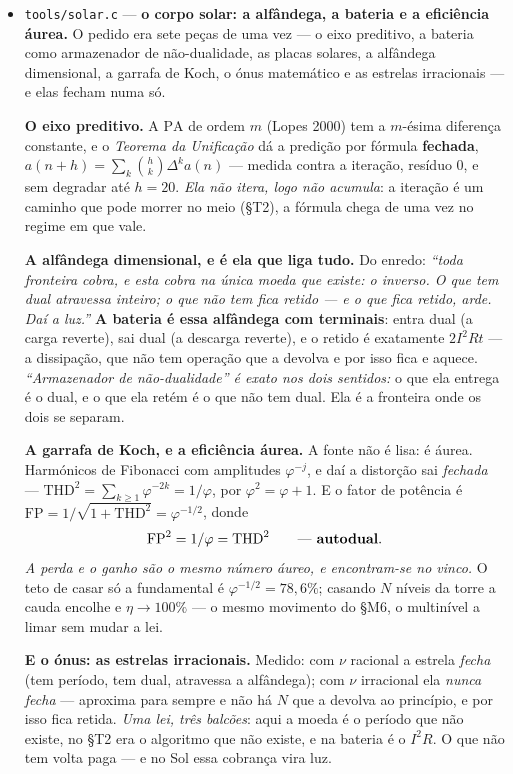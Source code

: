 \documentclass[11pt]{article}
\newcommand{\code}[1]{\texttt{\small #1}}
\theoremstyle{plain}
\theoremstyle{remark}
\begin{document}
\begin{itemize}
\item \code{tools/solar.c} --- \textbf{o corpo solar: a alfândega, a bateria e a eficiência
áurea.} O pedido era sete peças de uma vez --- o eixo preditivo, a bateria como armazenador de
não-dualidade, as placas solares, a alfândega dimensional, a garrafa de Koch, o ónus matemático e
as estrelas irracionais --- e elas fecham numa só.

\textbf{O eixo preditivo.} A $\mathrm{PA}$ de ordem $m$ (Lopes 2000) tem a $m$-ésima diferença
constante, e o \emph{Teorema da Unificação} dá a predição por fórmula \textbf{fechada},
$a(n{+}h)=\sum_k \binom{h}{k}\Delta^k a(n)$ --- medida contra a iteração, resíduo $0$, e sem
degradar até $h=20$. \emph{Ela não itera, logo não acumula}: a iteração é um caminho que pode
morrer no meio (§T2), a fórmula chega de uma vez no regime em que vale.

\textbf{A alfândega dimensional, e é ela que liga tudo.} Do enredo: \emph{``toda fronteira cobra, e
esta cobra na única moeda que existe: o inverso. O que tem dual atravessa inteiro; o que não tem
fica retido --- e o que fica retido, arde. Daí a luz.''} \textbf{A bateria é essa alfândega com
terminais}: entra dual (a carga reverte), sai dual (a descarga reverte), e o retido é exatamente
$2I^2Rt$ --- a dissipação, que não tem operação que a devolva e por isso fica e aquece.
\emph{``Armazenador de não-dualidade'' é exato nos dois sentidos:} o que ela entrega é o dual, e o
que ela retém é o que não tem dual. Ela é a fronteira onde os dois se separam.

\textbf{A garrafa de Koch, e a eficiência áurea.} A fonte não é lisa: é áurea. Harmónicos de
Fibonacci com amplitudes $\varphi^{-j}$, e daí a distorção sai \emph{fechada} --- $\mathrm{THD}^2 =
\sum_{k\ge1}\varphi^{-2k} = 1/\varphi$, por $\varphi^2=\varphi+1$. E o fator de potência é
$\mathrm{FP}=1/\sqrt{1+\mathrm{THD}^2}=\varphi^{-1/2}$, donde
\[
 \mathrm{FP}^2 = 1/\varphi = \mathrm{THD}^2 \qquad\text{--- \textbf{autodual}.}
\]
\emph{A perda e o ganho são o mesmo número áureo, e encontram-se no vinco.} O teto de casar só a
fundamental é $\varphi^{-1/2}=78{,}6\%$; casando $N$ níveis da torre a cauda encolhe e $\eta\to100\%$
--- o mesmo movimento do §M6, o multinível a limar sem mudar a lei.

\textbf{E o ónus: as estrelas irracionais.} Medido: com $\nu$ racional a estrela \emph{fecha} (tem
período, tem dual, atravessa a alfândega); com $\nu$ irracional ela \emph{nunca fecha} --- aproxima
para sempre e não há $N$ que a devolva ao princípio, e por isso fica retida. \emph{Uma lei, três
balcões}: aqui a moeda é o período que não existe, no §T2 era o algoritmo que não existe, e na
bateria é o $I^2R$. O que não tem volta paga --- e no Sol essa cobrança vira luz.


\end{itemize}
\end{document}

